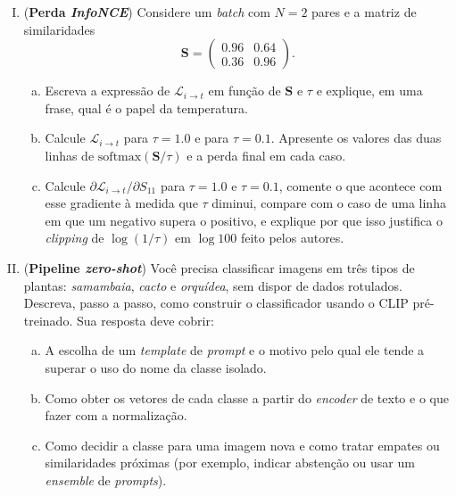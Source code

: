 \documentclass{dlproblemset}
\begin{document}
\begin{enumerate}[I)]

    \item {} (\textbf{Perda \textit{InfoNCE}}) Considere um \textit{batch} com $N = 2$ pares e a matriz de similaridades
    \[
        \mathbf{S} = \begin{pmatrix} 0.96 & 0.64 \\ 0.36 & 0.96 \end{pmatrix}.
    \]
    \begin{enumerate}[(a)]
        \item Escreva a expressão de $\mathcal{L}_{i \to t}$ em função de $\mathbf{S}$ e $\tau$ e explique, em uma frase, qual é o papel da temperatura.
        \item Calcule $\mathcal{L}_{i \to t}$ para $\tau = 1.0$ e para $\tau = 0.1$. Apresente os valores das duas linhas de $\mathrm{softmax}(\mathbf{S}/\tau)$ e a perda final em cada caso.
        \item Calcule $\partial \mathcal{L}_{i \to t}/\partial S_{11}$ para $\tau = 1.0$ e $\tau = 0.1$, comente o que acontece com esse gradiente à medida que $\tau$ diminui, compare com o caso de uma linha em que um negativo supera o positivo, e explique por que isso justifica o \textit{clipping} de $\log(1/\tau)$ em $\log 100$ feito pelos autores.
    \end{enumerate}

    \item (\textbf{Pipeline \textit{zero-shot}}) Você precisa classificar imagens em três tipos de plantas: \textit{samambaia}, \textit{cacto} e \textit{orquídea}, sem dispor de dados rotulados. Descreva, passo a passo, como construir o classificador usando o CLIP pré-treinado. Sua resposta deve cobrir:
    \begin{enumerate}[(a)]
        \item A escolha de um \textit{template} de \textit{prompt} e o motivo pelo qual ele tende a superar o uso do nome da classe isolado.
        \item Como obter os vetores de cada classe a partir do \textit{encoder} de texto e o que fazer com a normalização.
        \item Como decidir a classe para uma imagem nova e como tratar empates ou similaridades próximas (por exemplo, indicar abstenção ou usar um \textit{ensemble} de \textit{prompts}).
    \end{enumerate}


\end{enumerate}
\end{document}

